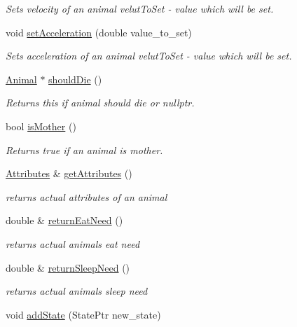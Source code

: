 \begin{DoxyCompactItemize}
\begin{DoxyCompactList}\small\item\em Sets velocity of an animal  velut\+To\+Set -\/ value which will be set. \end{DoxyCompactList}\item 
void \hyperlink{class_animal_ae455eb17f64f95f159c5f8fdc4a67728}{set\+Acceleration} (double value\+\_\+to\+\_\+set)
\begin{DoxyCompactList}\small\item\em Sets acceleration of an animal  velut\+To\+Set -\/ value which will be set. \end{DoxyCompactList}\item 
\hyperlink{class_animal}{Animal} $\ast$ \hyperlink{class_animal_adc62fe75008f9f24570d83f1279ba938}{should\+Die} ()
\begin{DoxyCompactList}\small\item\em Returns this if animal should die or nullptr. \end{DoxyCompactList}\item 
bool \hyperlink{class_animal_a88babf3ca0b62e73d713bbeda5982975}{is\+Mother} ()
\begin{DoxyCompactList}\small\item\em Returns true if an animal is mother. \end{DoxyCompactList}\item 
\hyperlink{class_attributes}{Attributes} \& \hyperlink{class_animal_af6d929cb70afccd523e4fdb8a7c7bc2f}{get\+Attributes} ()
\begin{DoxyCompactList}\small\item\em returns actual attributes of an animal \end{DoxyCompactList}\item 
double \& \hyperlink{class_animal_a616394b8840e25c445816d54140e2533}{return\+Eat\+Need} ()
\begin{DoxyCompactList}\small\item\em returns actual animal\textquotesingle{}s eat need \end{DoxyCompactList}\item 
double \& \hyperlink{class_animal_aeacd1807204f0a5c5eefedcd6a8a400a}{return\+Sleep\+Need} ()
\begin{DoxyCompactList}\small\item\em returns actual animal\textquotesingle{}s sleep need \end{DoxyCompactList}\item 
void \hyperlink{class_animal_a2be4b1b1d143492670ee7f22c55f3090}{add\+State} (State\+Ptr new\+\_\+state)

\end{DoxyCompactItemize}
